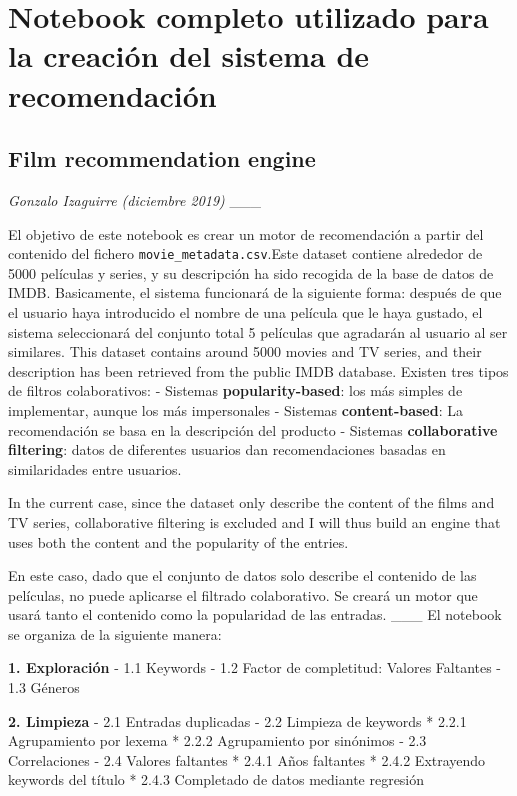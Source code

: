 \chapter{Notebook completo utilizado para la creación del sistema de recomendación}\label{app:notebook}

\section{\texorpdfstring{\textbf{Film recommendation
engine}}{Film recommendation engine}}\label{film-recommendation-engine}

\emph{Gonzalo Izaguirre (diciembre 2019)} \_\_\_

El objetivo de este notebook es crear un motor de recomendación a partir
del contenido del fichero \texttt{movie\_metadata.csv}.Este dataset
contiene alrededor de 5000 películas y series, y su descripción ha sido
recogida de la base de datos de IMDB. Basicamente, el sistema funcionará
de la siguiente forma: después de que el usuario haya introducido el
nombre de una película que le haya gustado, el sistema seleccionará del
conjunto total 5 películas que agradarán al usuario al ser similares.
This dataset contains around 5000 movies and TV series, and their
description has been retrieved from the public IMDB database. Existen
tres tipos de filtros colaborativos: - Sistemas
\textbf{popularity-based}: los más simples de implementar, aunque los
más impersonales - Sistemas \textbf{content-based}: La recomendación se
basa en la descripción del producto - Sistemas \textbf{collaborative
filtering}: datos de diferentes usuarios dan recomendaciones basadas en
similaridades entre usuarios.

In the current case, since the dataset only describe the content of the
films and TV series, collaborative filtering is excluded and I will thus
build an engine that uses both the content and the popularity of the
entries.

En este caso, dado que el conjunto de datos solo describe el contenido
de las películas, no puede aplicarse el filtrado colaborativo. Se creará
un motor que usará tanto el contenido como la popularidad de las
entradas. \_\_\_ El notebook se organiza de la siguiente manera:

\textbf{1. Exploración} - 1.1 Keywords - 1.2 Factor de completitud:
Valores Faltantes - 1.3 Géneros

\textbf{2. Limpieza} - 2.1 Entradas duplicadas - 2.2 Limpieza de
keywords * 2.2.1 Agrupamiento por lexema * 2.2.2 Agrupamiento por
sinónimos - 2.3 Correlaciones - 2.4 Valores faltantes * 2.4.1 Años
faltantes * 2.4.2 Extrayendo keywords del título * 2.4.3 Completado de
datos mediante regresión

